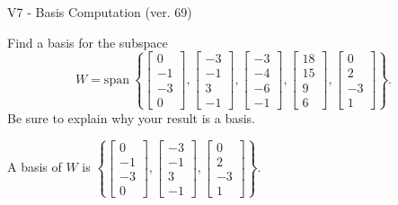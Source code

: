 \begin{exercise}
  \begin{exerciseTitle}V7 - Basis Computation (ver. 69)\end{exerciseTitle}
  \begin{exerciseStatement}
    Find a basis for the subspace 
\[W=\mathrm{span}\ \left\{\left[\begin{array}{r}
0 \\
-1 \\
-3 \\
0
\end{array}\right] , \left[\begin{array}{r}
-3 \\
-1 \\
3 \\
-1
\end{array}\right] , \left[\begin{array}{r}
-3 \\
-4 \\
-6 \\
-1
\end{array}\right] , \left[\begin{array}{r}
18 \\
15 \\
9 \\
6
\end{array}\right] , \left[\begin{array}{r}
0 \\
2 \\
-3 \\
1
\end{array}\right]\right\}.\]
 Be sure to explain why your result is a basis.


  \end{exerciseStatement}
  \begin{exerciseAnswer}
   A basis of \(W\) is  \(\left\{\left[\begin{array}{r}
0 \\
-1 \\
-3 \\
0
\end{array}\right] , \left[\begin{array}{r}
-3 \\
-1 \\
3 \\
-1
\end{array}\right] , \left[\begin{array}{r}
0 \\
2 \\
-3 \\
1
\end{array}\right]\right\}\).
  


  \end{exerciseAnswer}
\end{exercise}